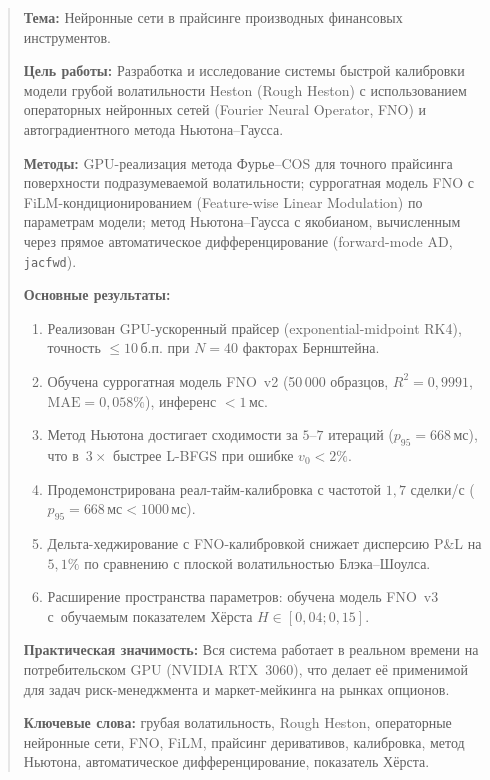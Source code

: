 \documentclass[12pt, a4paper]{article}
\begin{document}
\newpage
\begin{abstract}
\noindent
\textbf{Тема:} Нейронные сети в прайсинге производных финансовых инструментов.

\medskip\noindent
\textbf{Цель работы:} Разработка и исследование системы быстрой калибровки
модели грубой волатильности Heston (Rough Heston) с использованием
операторных нейронных сетей (Fourier Neural Operator, FNO)
и автоградиентного метода Ньютона--Гаусса.

\medskip\noindent
\textbf{Методы:} GPU-реализация метода Фурье--COS для точного прайсинга
поверхности подразумеваемой волатильности; суррогатная модель FNO
с FiLM-кондиционированием (Feature-wise Linear Modulation) по параметрам
модели; метод Ньютона--Гаусса с якобианом, вычисленным через прямое
автоматическое дифференцирование (forward-mode AD, \texttt{jacfwd}).

\medskip\noindent
\textbf{Основные результаты:}
\begin{enumerate}[leftmargin=2cm]
  \item Реализован GPU-ускоренный прайсер (exponential-midpoint RK4),
        точность $\leq\!10\,\text{б.п.}$ при $N=40$ факторах Бернштейна.
  \item Обучена суррогатная модель FNO~v2 (50\,000 образцов, $R^2 = 0{,}9991$,
        $\text{MAE} = 0{,}058\%$), инференс $<\!1\,\text{мс}$.
  \item Метод Ньютона достигает сходимости за $5$--$7$ итераций
        ($p_{95} = 668\,\text{мс}$), что в~$3\times$ быстрее L-BFGS
        при ошибке $v_0 < 2\%$.
  \item Продемонстрирована реал-тайм-калибровка с частотой $1{,}7$ сделки/с
        ($p_{95} = 668\,\text{мс} < 1000\,\text{мс}$).
  \item Дельта-хеджирование с FNO-калибровкой снижает дисперсию P\&L на $5{,}1\%$
        по сравнению с плоской волатильностью Блэка--Шоулса.
  \item Расширение пространства параметров: обучена модель FNO~v3
        с~обучаемым показателем Хёрста $H \in [0{,}04; 0{,}15]$.
\end{enumerate}

\medskip\noindent
\textbf{Практическая значимость:} Вся система работает в реальном времени
на потребительском GPU (NVIDIA RTX~3060), что делает её применимой
для задач риск-менеджмента и маркет-мейкинга на рынках опционов.

\medskip\noindent
\textbf{Ключевые слова:} грубая волатильность, Rough Heston, операторные
нейронные сети, FNO, FiLM, прайсинг деривативов, калибровка, метод Ньютона,
автоматическое дифференцирование, показатель Хёрста.
\end{abstract}

\newpage
\tableofcontents
\newpage


\newpage

\newpage

\newpage

\newpage

\newpage

\newpage

\newpage

\newpage

\printbibliography[heading=bibintoc, title={Список литературы}]
\end{document}
